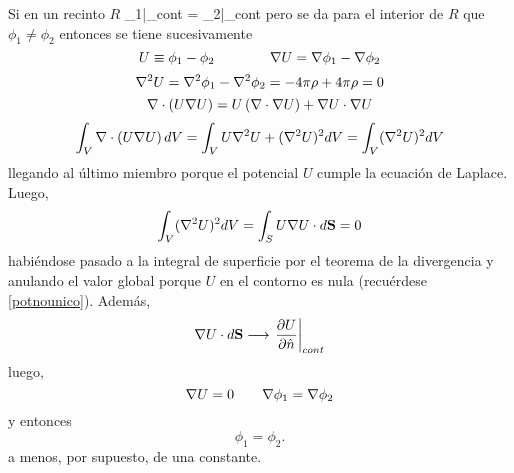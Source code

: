 \documentclass[10pt,oneside]{CBFT_book}
\begin{document}
Si en un recinto $R$
\be
	\phi_1|_{cont} = \phi_2|_{cont}
	\label{potnounico}
\ee
pero se da para el interior de $R$ que $\phi_1\neq\phi_2$ entonces se tiene sucesivamente
\[
	U \equiv \phi_1 - \phi_2 \qquad \qquad \mathbf{\nabla} U = \mathbf{\nabla} \phi_1 - \mathbf{\nabla} \phi_2
\]
\[
	\nabla^2{U} = \nabla^2{\phi_1} - \nabla^2{\phi_2} = -4\pi \rho + 4\pi\rho = 0
\]
\[
	\mathbf{\nabla}\cdot\left( U\mathbf{\nabla} U \right) = U\left( \mathbf{\nabla}\cdot\mathbf{\nabla} U \right) + \mathbf{\nabla} U \cdot \mathbf{\nabla} U
\]
\[
	\int_V \mathbf{\nabla}\cdot\left( U\mathbf{\nabla} U \right) dV = \int_V U \nabla^2{U}  + (\nabla^2{U})^2 dV =  \int_V (\nabla^2{U})^2 dV
\]
llegando al último miembro porque el potencial $U$ cumple la ecuación de Laplace. Luego,
\[
	\int_V (\lapm{U})^2 dV = \int_S U\Nabla{U} \cdot d\vb{S} = 0
\]
habiéndose pasado a la integral de superficie por el teorema de la divergencia y anulando el valor global porque 
$U$ en el contorno es nula (recuérdese \eqref{potnounico}). Además, 
\[
	\Nabla{U} \cdot d\vb{S}  \longrightarrow \left.\dpar{U}{\hat{n}}\right|_{cont}
\]
luego,
\[
	\mathbf{\nabla} U = 0 \qquad \mathbf{\nabla}\phi_1 = \mathbf{\nabla}\phi_2 
\]
y entonces
\[
	\phi_1 = \phi_2 .
\]
a menos, por supuesto, de una constante.



\end{document}
